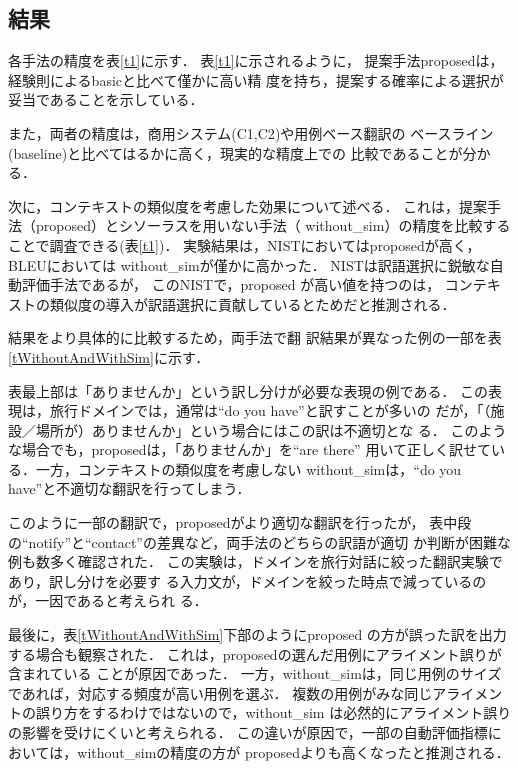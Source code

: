 \subsection{結果}

各手法の精度を表\ref{t1}に示す．
表\ref{t1}に示されるように，
提案手法{\sc proposed}は，経験則による{\sc basic}と比べて僅かに高い精
度を持ち，提案する確率による選択が妥当であることを示している．

また，両者の精度は，商用システム({\sc C1},{\sc C2})や用例ベース翻訳の
ベースライン({\sc baseline})と比べてはるかに高く，現実的な精度上での
比較であることが分かる．

次に，コンテキストの類似度を考慮した効果について述べる．
これは，提案手法（{\sc proposed}）とシソーラスを用いない手法（{\sc
without\_sim}）の精度を比較することで調査できる(表\ref{t1})．
実験結果は，NISTにおいては{\sc proposed}が高く，BLEUにおいては{\sc
without\_sim}が僅かに高かった．
NISTは訳語選択に鋭敏な自動評価手法であるが，
このNISTで，{\sc proposed} が高い値を持つのは，
コンテキストの類似度の導入が訳語選択に貢献しているとためだと推測される．


結果をより具体的に比較するため，両手法で翻
訳結果が異なった例の一部を表\ref{tWithoutAndWithSim}に示す．

表最上部は「ありませんか」という訳し分けが必要な表現の例である．
この表現は，旅行ドメインでは，通常は``do you have''と訳すことが多いの
だが，「（施設／場所が）ありませんか」という場合にはこの訳は不適切とな
る．
このような場合でも，{\sc proposed}は，「ありませんか」を``are there''
用いて正しく訳せている．一方，コンテキストの類似度を考慮しない{\sc
without\_sim}は，``do you have''と不適切な翻訳を行ってしまう．


このように一部の翻訳で，{\sc proposed}がより適切な翻訳を行ったが，
表中段の``notify''と``contact''の差異など，両手法のどちらの訳語が適切
か判断が困難な例も数多く確認された．
この実験は，ドメインを旅行対話に絞った翻訳実験であり，訳し分けを必要す
る入力文が，ドメインを絞った時点で減っているのが，一因であると考えられ
る．





最後に，表\ref{tWithoutAndWithSim}下部のように{\sc proposed} 
の方が誤った訳を出力する場合も観察された．
これは，{\sc proposed}の選んだ用例にアライメント誤りが含まれている
ことが原因であった．
一方，{\sc without\_sim}は，同じ用例のサイズであれば，対応する頻度が高い用例を選ぶ．
複数の用例がみな同じアライメントの誤り方をするわけではないので，{\sc without\_sim}
は必然的にアライメント誤りの影響を受けにくいと考えられる．
この違いが原因で，一部の自動評価指標においては，{\sc without\_sim}の精度の方が
{\sc proposed}よりも高くなったと推測される．




